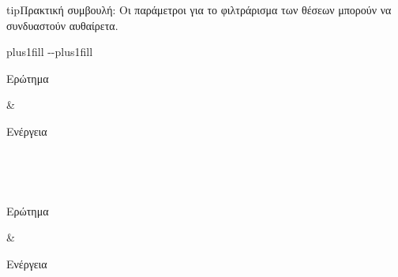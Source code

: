 \documentclass[letterpaper,10pt,greek]{sphinxmanual}
\begin{document}
\begin{sphinxadmonition}{tip}{Πρακτική συμβουλή:}
\sphinxAtStartPar
Οι παράμετροι για το φιλτράρισμα των θέσεων μπορούν να συνδυαστούν αυθαίρετα.
\end{sphinxadmonition}


\begin{savenotes}
\sphinxatlongtablestart
\sphinxthistablewithglobalstyle
\makeatletter
  \LTleft \@totalleftmargin plus1fill
  \LTright\dimexpr\columnwidth-\@totalleftmargin-\linewidth\relax plus1fill
\makeatother
\begin{longtable}{}
\sphinxtoprule
\begin{varwidth}[t]{}
\sphinxstyletheadfamily \sphinxAtStartPar
Ερώτημα
\sphinxbeforeendvarwidth
\end{varwidth}%
&\begin{varwidth}[t]{}
\sphinxstyletheadfamily \sphinxAtStartPar
Ενέργεια
\sphinxbeforeendvarwidth
\end{varwidth}%
\\
\sphinxmidrule
\endfirsthead

\\
\sphinxtoprule
\begin{varwidth}[t]{}
\sphinxstyletheadfamily \sphinxAtStartPar
Ερώτημα
\sphinxbeforeendvarwidth
\end{varwidth}%
&\begin{varwidth}[t]{}
\sphinxstyletheadfamily \sphinxAtStartPar
Ενέργεια
\sphinxbeforeendvarwidth
\end{varwidth}%
\\
\sphinxmidrule
\endhead

\sphinxbottomrule
{}\\
\endfoot


\end{longtable}
\end{savenotes}
\end{document}
